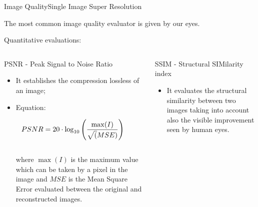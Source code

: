 \documentclass[10pt, unicode]{beamer}
\begin{document}

\begin{frame}{Image Quality}{Single Image Super Resolution}




  \scriptsize{The most common image quality evaluator is given by our eyes.}

  \scriptsize{Quantitative evaluations:}

  \begin{columns}
    \begin{column}{0.4\textwidth}
      \hspace{-0.75cm}
      \begin{block}{PSNR - Peak Signal to Noise Ratio}
        \begin{itemize}
          \item It establishes the compression lossless of an image;

          \item Equation:

          \begin{equation*}
          \hspace{-0.75cm}
          PSNR = 20 \cdot \log_{10}\left( \frac{\max(I)}{\sqrt(MSE)} \right)
          \end{equation*}
          \\
          where $\max(I)$ is the maximum value which can be taken by a pixel in the image and $MSE$ is the Mean Square Error evaluated between the original and reconstructed images.
        \end{itemize}
      \end{block}
    \end{column}
    \begin{column}{0.65\textwidth}
      \begin{alertblock}{SSIM - Structural SIMilarity index}
        \begin{itemize}
          \item It evaluates the structural similarity between two images taking into account also the visible improvement seen by human eyes.


\end{itemize}
\end{alertblock}
\end{column}
\end{columns}
\end{frame}
\end{document}
